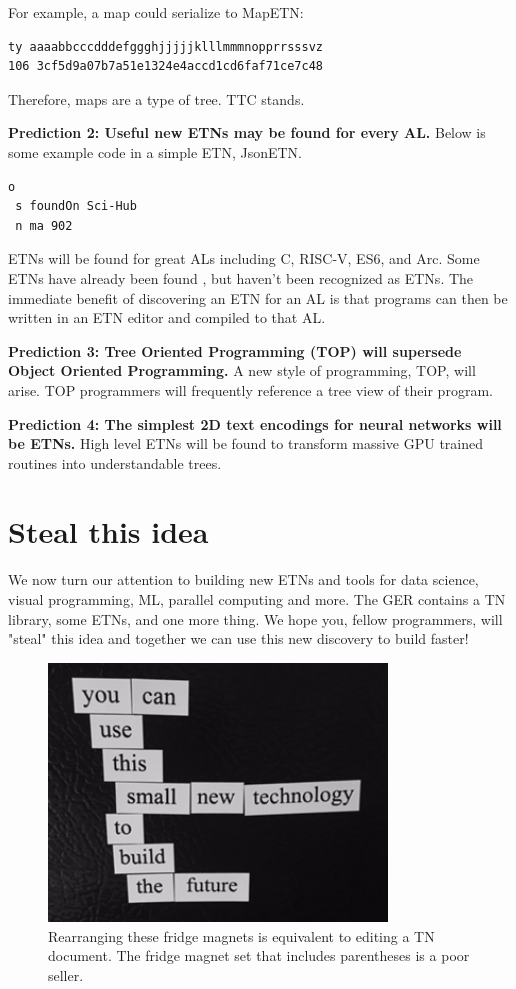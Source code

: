 \documentclass[journal]{IEEEtran}
\begin{document}
For example, a map could serialize to MapETN:

\begin{lstlisting}
ty aaaabbcccdddefggghjjjjjklllmmmnopprrsssvz
106 3cf5d9a07b7a51e1324e4accd1cd6faf71ce7c48
\end{lstlisting}

Therefore, maps are a type of tree. TTC stands.

\textbf{Prediction 2: Useful new ETNs may be found for every AL.} Below is some example code in a simple ETN, JsonETN.

\begin{lstlisting}
o
 s foundOn Sci-Hub
 n ma 902
\end{lstlisting}

ETNs will be found for great ALs including C, RISC-V, ES6, and Arc. Some ETNs have already been found \cite{Roughan}, but haven't been recognized as ETNs. The immediate benefit of discovering an ETN for an AL is that programs can then be written in an ETN editor and compiled to that AL.

\textbf{Prediction 3: Tree Oriented Programming (TOP) will supersede Object Oriented Programming.} A new style of programming, TOP, will arise. TOP programmers will frequently reference a tree view of their program.

\textbf{Prediction 4: The simplest 2D text encodings for neural networks will be ETNs.} High level ETNs will be found to transform massive GPU trained routines into understandable trees.

\section{Steal this idea}

We now turn our attention to building new ETNs and tools for data science, visual programming, ML, parallel computing and more. The GER contains a TN library, some ETNs, and one more thing. We hope you, fellow programmers, will "steal" this idea and together we can use this new discovery to build faster!
\begin{figure}[ht!]
\centering
\includegraphics[width=90mm]{tree.jpg}
\caption{Rearranging these fridge magnets is equivalent to editing a TN document. The fridge magnet set that includes parentheses is a poor seller.}
\end{figure}
\end{document}
